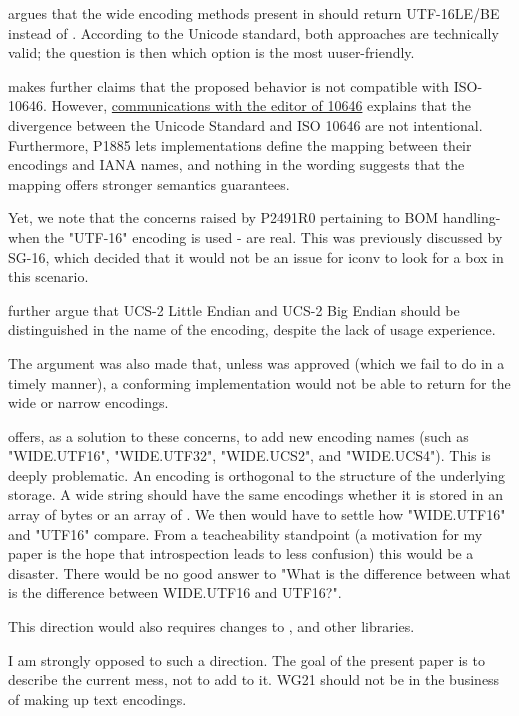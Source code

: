 \documentclass{wg21}
\begin{document}
 argues that the wide encoding methods present in  should return UTF-16LE/BE instead of .
According to the Unicode standard, both approaches are technically valid; the question is then which option is the most uuser-friendly.

\begin{note}
     makes further claims that the proposed behavior is not compatible with ISO-10646. However, \href{https://lists.isocpp.org/sg16/2021/11/2856.php}{communications with the editor of 10646} explains that the divergence between the Unicode Standard and ISO 10646 are not intentional. Furthermore, P1885 lets implementations define the mapping between their encodings and IANA names, and nothing in the wording suggests that the mapping offers stronger semantics guarantees.
\end{note}

Yet, we note that the concerns raised by P2491R0 pertaining to  BOM handling- when the "UTF-16" encoding is used - are real. This was previously discussed by SG-16, which decided that it would not be an issue for iconv to look for a box in this scenario.


 further argue that UCS-2 Little Endian and UCS-2 Big Endian should be distinguished in the name of the encoding,
despite the lack of usage experience.

The argument was also made that, unless  was approved (which we fail to do in a timely manner), a conforming implementation would not be able to return  for the wide or narrow encodings.


 offers, as a solution to these concerns, to add new encoding names (such as "WIDE.UTF16", "WIDE.UTF32", "WIDE.UCS2", and "WIDE.UCS4").
This is deeply problematic.
An encoding is orthogonal to the structure of the underlying storage. A wide string should have the same encodings whether it is stored in an array of bytes or an array of .
We then would have to settle how "WIDE.UTF16" and "UTF16" compare.
From a teacheability standpoint (a motivation for my paper is the hope that introspection leads to less confusion) this would be a disaster.
There would be no good answer to "What is the difference between what is the difference between WIDE.UTF16 and UTF16?".

This direction would also requires changes to ,  and other libraries.

I am strongly opposed to such a direction. The goal of the present paper is to describe the current mess, not to add to it.
WG21 should not be in the business of making up text encodings.
\end{document}

